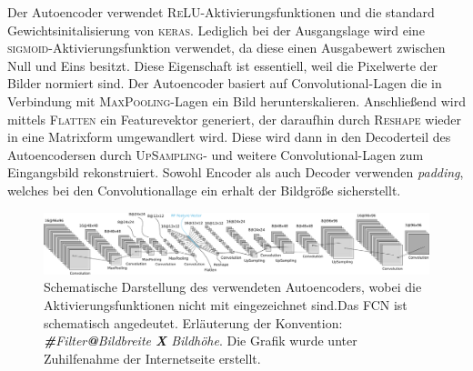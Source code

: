 Der Autoencoder verwendet \textsc{ReLU}-Aktivierungsfunktionen
und die standard Gewichtsinitalisierung von \textsc{keras}.
Lediglich bei der Ausgangslage wird eine \textsc{sigmoid}-Aktivierungsfunktion verwendet, da diese einen Ausgabewert zwischen Null und Eins besitzt. Diese Eigenschaft ist essentiell,
weil die Pixelwerte der Bilder normiert sind.
Der Autoencoder basiert auf Convolutional-Lagen die in Verbindung mit
\textsc{MaxPooling}-Lagen ein Bild herunterskalieren. Anschließend wird
mittels \textsc{Flatten} ein Featurevektor generiert, der daraufhin durch
\textsc{Reshape} wieder in eine Matrixform umgewandlert wird. Diese wird dann
in den Decoderteil des Autoencodersen durch \textsc{UpSampling}- und weitere
Convolutional-Lagen zum Eingangsbild rekonstruiert. Sowohl Encoder als auch Decoder
verwenden \emph{padding}, welches bei den Convolutionallage ein erhalt der Bildgröße
sicherstellt.
\begin{figure}
\centering
\includegraphics[width=\the\textwidth]{../../final_data/general/autoencoder.pdf}
\caption{Schematische Darstellung des verwendeten Autoencoders, wobei
         die Aktivierungsfunktionen nicht mit eingezeichnet sind.Das FCN
         ist schematisch angedeutet. Erläuterung der Konvention: \emph{\textbf{\#}Filter\textbf{@}Bildbreite \textbf{X} Bildhöhe}.
         Die Grafik wurde unter Zuhilfenahme der Internetseite \cite{net_svg_source} erstellt.}
\label{fig:Autoencoder}
\end{figure}
